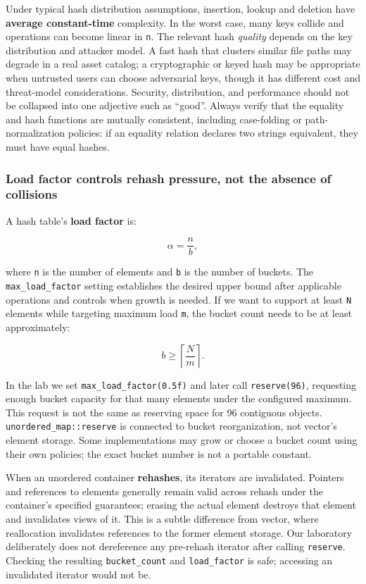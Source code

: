Under typical hash distribution assumptions, insertion, lookup and deletion have \textbf{average constant-time} complexity. In the worst case, many keys collide and operations can become linear in \texttt{n}. The relevant hash \emph{quality} depends on the key distribution and attacker model. A fast hash that clusters similar file paths may degrade in a real asset catalog; a cryptographic or keyed hash may be appropriate when untrusted users can choose adversarial keys, though it has different cost and threat-model considerations. Security, distribution, and performance should not be collapsed into one adjective such as ``good''. Always verify that the equality and hash functions are mutually consistent, including case-folding or path-normalization policies: if an equality relation declares two strings equivalent, they must have equal hashes.

\subsubsection{Load factor controls rehash pressure, not the absence of collisions}\label{load-factor-controls-rehash-pressure-not-the-absence-of-collisions}

A hash table's \textbf{load factor} is:

\[
\alpha = \frac{n}{b},
\]

where \texttt{n} is the number of elements and \texttt{b} is the number of buckets. The \texttt{max\_load\_factor} setting establishes the desired upper bound after applicable operations and controls when growth is needed. If we want to support at least \texttt{N} elements while targeting maximum load \texttt{m}, the bucket count needs to be at least approximately:

\[
b \ge \left\lceil \frac{N}{m} \right\rceil.
\]

In the lab we set \texttt{max\_load\_factor(0.5f)} and later call \texttt{reserve(96)}, requesting enough bucket capacity for that many elements under the configured maximum. This request is not the same as reserving space for 96 contiguous objects. \texttt{unordered\_map::reserve} is connected to bucket reorganization, not vector's element storage. Some implementations may grow or choose a bucket count using their own policies; the exact bucket number is not a portable constant.

When an unordered container \textbf{rehashes}, its iterators are invalidated. Pointers and references to elements generally remain valid across rehash under the container's specified guarantees; erasing the actual element destroys that element and invalidates views of it. This is a subtle difference from vector, where reallocation invalidates references to the former element storage. Our laboratory deliberately does not dereference any pre-rehash iterator after calling \texttt{reserve}. Checking the resulting \texttt{bucket\_count} and \texttt{load\_factor} is safe; accessing an invalidated iterator would not be.

